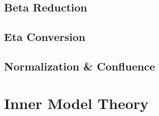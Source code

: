 \subsection{Beta Reduction}\label{subsec:beta_reduction}

\subsection{Eta Conversion}\label{subsec:eta_conversion}

\subsection{Normalization \& Confluence}\label{subsec:normalization_confluence}



\section{Inner Model Theory}\label{sec:inner_model_theory}
